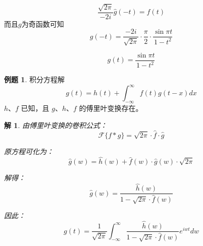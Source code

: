 \documentclass[12pt,a4paper]{article}
\numberwithin{subsection}{section}   %
\numberwithin{subsubsection}{subsection}
\theoremstyle{plain}
\newtheorem{solution}{解}[subsection]  %
\theoremstyle{definition}
\newtheorem{example}{例题}[subsection]  %
\theoremstyle{remark}
\theoremstyle{remark}
\begin{document}
\begin{equation}
	\frac{\sqrt{2\pi}}{-2i} \hat{g}(-t) = \hat{f}(t)
\end{equation}
而且\(g\)为奇函数可知
\begin{equation}
	g(-t) = \frac{-2i}{\sqrt{2\pi}} \cdot \frac{\pi}{2} \cdot \frac{\sin \pi t}{1 - t^2}
\end{equation}

\begin{equation}
	g(t) = \frac{\sin\pi t}{1 - t^2}
\end{equation}
			
\begin{example}
	积分方程解
	\begin{equation}
	  g(t) = h(t) + \int_{-\infty}^{\infty} f(t) g(t - x) dx
\end{equation}
	\( h \)、\( f \) 已知，且 \( g \)、\( h \)、\( f \) 的傅里叶变换存在。
	
	\begin{solution}
		由傅里叶变换的卷积公式：
		\begin{equation}
			\mathcal{F}\{f * g\} = \sqrt{2\pi} \cdot \hat{f} \cdot \hat{g}
		\end{equation}
		
		原方程可化为：
		\begin{equation}
			\hat{g}(w) = \hat{h}(w) + \hat{f}(w) \cdot \hat{g}(w) \cdot \sqrt{2\pi}
		\end{equation}
		
		解得：
		\begin{equation}
			\hat{g}(w) = \frac{\hat{h}(w)}{1 - \sqrt{2\pi} \cdot \hat{f}(w)}
		\end{equation}
		
		因此：
		\begin{equation}
			g(t) = \frac{1}{\sqrt{2\pi}} \int_{-\infty}^{\infty} \frac{\hat{h}(w)}{1 - \sqrt{2\pi} \cdot \hat{f}(w)} e^{iwt} dw
		\end{equation}
		
	\end{solution}
\end{example}
\end{document}
